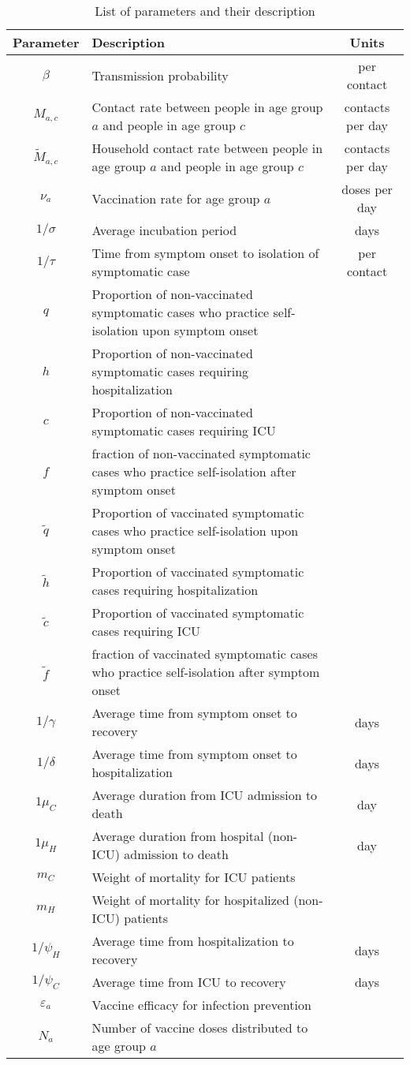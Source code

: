 \documentclass[10pt]{article}
\begin{document}
\newpage
\begin{centering}
\begin{table}\caption{List of parameters and their description}
\begin{tabular}{clc}
Parameter & Description & Units\\
\hline $\beta$ &Transmission probability & per contact\\
$M_{a,c}$ & Contact rate between people in age group $a$ and people in age group $c$ & contacts  per day\\
$\tilde M_{a,c}$ & Household contact rate between people in age group $a$ and people in age group $c$ &contacts per day\\
$\nu_a$ & Vaccination rate for age group $a$ & doses per day\\
$1/\sigma$ & Average  incubation period & days\\
$1/\tau $ & Time from symptom onset to isolation of symptomatic case  & per contact \\
$q$ & Proportion of non-vaccinated symptomatic cases who practice self-isolation upon symptom onset & \\
$h$ & Proportion of non-vaccinated symptomatic cases requiring hospitalization &   \\
$c$ & Proportion of non-vaccinated symptomatic cases requiring  ICU &   \\
$f$ & fraction of non-vaccinated symptomatic cases who practice self-isolation after symptom onset &   \\
$\tilde q$ & Proportion of vaccinated symptomatic cases who practice self-isolation upon symptom onset & \\
$\tilde h$ & Proportion of vaccinated symptomatic cases requiring hospitalization &   \\
$\tilde c$ & Proportion of vaccinated symptomatic cases requiring ICU &   \\
$\tilde f$ & fraction of vaccinated symptomatic cases who practice self-isolation after symptom onset &   \\
$1/\gamma$ & Average time from symptom onset to recovery & days\\
$1/\delta$ & Average time from symptom onset to  hospitalization & days\\
$1\mu_C$ & Average duration from ICU admission to death &  day\\
$1\mu_H$ &  Average duration from hospital (non-ICU) admission to death &  day\\
$m_C$ & Weight of mortality for ICU patients & \\
$m_H$ & Weight of mortality for hospitalized (non-ICU) patients   & \\
$1/\psi_H$ & Average time from hospitalization to recovery & days\\
$1/\psi_C$ & Average time from ICU to recovery & days\\
$\varepsilon_a$ & Vaccine efficacy for infection prevention & \\
 $N_a$ & Number of vaccine doses distributed to age group $a$ \\
\end{tabular}
\end{table}
\end{centering}
\end{document}
